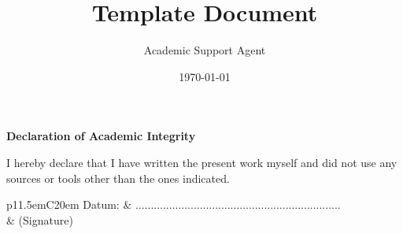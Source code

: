 \documentclass{article}
\title{Template Document}
\author{Academic Support Agent}
\date{\today}
\begin{document}
\maketitle

	


	
	
	
	\renewcommand{\baselinestretch}{1.05}
	\small\normalsize







	





%	


\newpage
\thispagestyle{empty}
\begin{center}
	\vspace*{5em}
	\huge\textbf{Declaration of Academic Integrity}\\
\end{center}
\vspace{2em}
I hereby declare that I have written the present work myself and did not use any sources
or tools other than the ones indicated.

\vspace{4em}
\begin{minipage}{\linewidth}
	\centering
	\begin{tabular}{p{11.5em}C{20em}}
		Datum: &  ...................................................................\\
		& \centering (Signature)\\
	\end{tabular}
\end{minipage}
\end{document}
